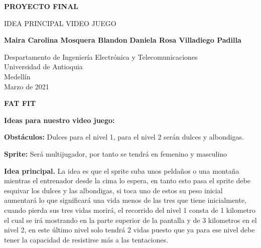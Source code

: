 \documentclass{article}
\begin{document}
\begin{titlepage}
    \begin{center}
        \vspace*{1cm}
            
        \Huge
        \textbf{PROYECTO FINAL}
            
        \vspace{0.5cm}
        \LARGE
        IDEA PRINCIPAL VIDEO JUEGO
            
        \vspace{1.5cm}
        
        \textbf{Maira Carolina Mosquera Blandon}    
        \textbf{Daniela Rosa Villadiego Padilla}
            
        \vfill
            
        \vspace{0.8cm}
            
        \Large
        Despartamento de Ingeniería Electrónica y Telecomunicaciones\\
        Universidad de Antioquia\\
        Medellín\\
        Marzo de 2021
            
    \end{center}
\end{titlepage}

  \textbf{FAT FIT} \label{contenido}
  
   \vspace{0.3cm}

    \textbf{Ideas para nuestro video juego:}
    
     \vspace{0.3cm}
     
      \textbf{Obstáculos:} Dulces para el nivel 1, para el nivel 2 serán dulces y albondigas.
    
     \vspace{0.3cm}
     
     \textbf{Sprite:} Será multijugador, por tanto se tendrá en femenino y masculino
     
     \vspace{0.3cm}
      
     \textbf{Idea principal. }  La idea es que el sprite suba unos peldaños o una montaña mientras el entrenador desde la cima lo espera, en tanto esto pasa el sprite debe esquivar los dulces y las albondigas, si toca uno de estos su peso inicial aumentará lo que significará una vida menos de las tres que tiene inicialmente, cuando pierda sus tres vidas morirá, el recorrido del nivel 1 consta de 1 kilometro el cual se irá mostrando en la parte superior de la pantalla y de 3 kilometros en el nivel 2, en este último nivel solo tendrá 2 vidas puesto que ya para ese nivel debe tener la capacidad de resistirse más a las tentaciones.
      
\end{document}
